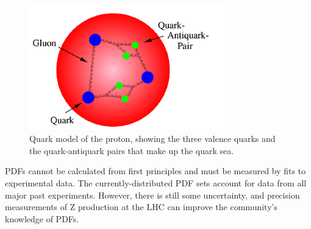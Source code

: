 
 \begin{figure}[htb]
  \begin{center}
    \includegraphics[width=240pt]{Figures/theory-quark-proton-naif-desy.png}
  \end{center}
  \caption[Quark model of proton]
	  {Quark model of the proton, 
	    showing the three valence quarks 
	    and the quark-antiquark pairs 
	    that make up the quark sea. 
	  }
  \label{fig:ProtonQuarkModel}
 \end{figure}



PDFs cannot be calculated from first 
principles and must be measured by fits 
to experimental data.  
The currently-distributed PDF sets 
account for data from all major past experiments.  
However, there is still some uncertainty, 
and precision measurements of Z production 
at the LHC can %
improve the community's knowledge of PDFs.  




